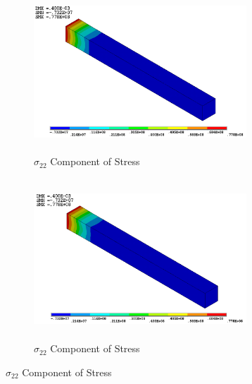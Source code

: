 \documentclass[12pt,openright,twoside]{report}
\begin{document}
\begin{figure}[htbp!]\ContinuedFloat     
     \begin{subfigure}[b]{0.4\textwidth}
        \includegraphics[width=8cm,height=6cm]{16.Ansys_SY.png}
         \caption{ $\sigma_{22}$ Component of Stress}
         \label{fig:Y Component of Stress}
     \end{subfigure}
    \hspace{1.8cm}
      \begin{subfigure}[b]{0.4\textwidth}
         \includegraphics[width=8cm,height=6cm]{19.User_SY.png}
         \caption{ $\sigma_{22}$ Component of Stress}
         \label{fig:Y Component of Stress2}
     \end{subfigure}
\end{figure}
\FloatBarrier
\end{document}
